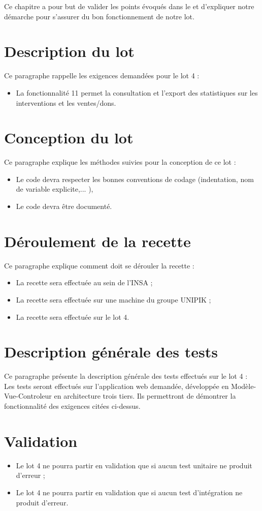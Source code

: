 
	Ce chapitre a pour but de valider les points évoqués dans le \DSE{} et d'expliquer notre démarche pour s'assurer du bon fonctionnement de notre lot.
	
\section{Description du lot}
	Ce paragraphe rappelle les exigences demandées pour le lot 4 :
	\begin{itemize}
		\item La fonctionnalité 11 permet la consultation et l'export des statistiques sur les interventions et les ventes/dons.
	\end{itemize}
	
\section{Conception du lot}
	Ce paragraphe explique les méthodes suivies pour la conception de ce lot :
	\begin{itemize}
		\item Le code devra respecter les bonnes conventions de codage (indentation, nom de variable explicite,... ),
		\item Le code devra être documenté.
	\end{itemize}
	
\section{Déroulement de la recette}
	Ce paragraphe explique comment doit se dérouler la recette : 
	\begin{itemize}
		\item La recette sera effectuée au sein de l'INSA ;
		\item La recette sera effectuée sur une machine du groupe UNIPIK ;
		\item La recette sera effectuée sur le lot 4.
	\end{itemize}

\section{Description générale des tests}
	Ce paragraphe présente la description générale des tests effectués sur le lot 4 :	\\
	
	Les tests seront effectués sur l'application web demandée, développée en Modèle-Vue-Controleur en architecture trois tiers. Ils permettront de démontrer la fonctionnalité des exigences citées ci-dessus.

\section{Validation}	
	\begin{itemize}
		\item Le lot 4 ne pourra partir en validation que si aucun test unitaire ne produit d'erreur ;
		\item Le lot 4 ne pourra partir en validation que si aucun test d’intégration ne produit d'erreur.
	\end{itemize}
	
